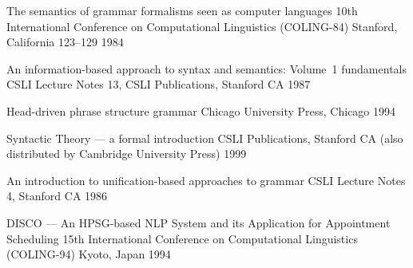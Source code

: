 \documentclass[12pt]{report}
\begin{document}
\begin{list}{}
{The semantics of grammar formalisms seen as computer languages}
{10th International Conference on Computational Linguistics
(COLING-84)}
{Stanford, California}
{123--129}
{1984}

 {An information-based approach to syntax and semantics: 
Volume~1 fundamentals} 
 {CSLI Lecture Notes 13, CSLI Publications, Stanford CA}
 {1987}

    {Head-driven phrase structure grammar}
    {Chicago University Press, Chicago}
    {1994}

     {Syntactic Theory --- a formal introduction}
     {CSLI Publications, Stanford CA (also distributed by 
Cambridge University Press)}
     {1999}
    
{An introduction to unification-based approaches to grammar}
{CSLI Lecture Notes 4, Stanford CA}
{1986}

{{DISCO} --- An {HPSG}-based {NLP} System and its Application for 
Appointment Scheduling}
{15th International Conference on Computational
Linguistics (COLING-94)}
{Kyoto, Japan}
{1994}

\end{list}
\end{document}
